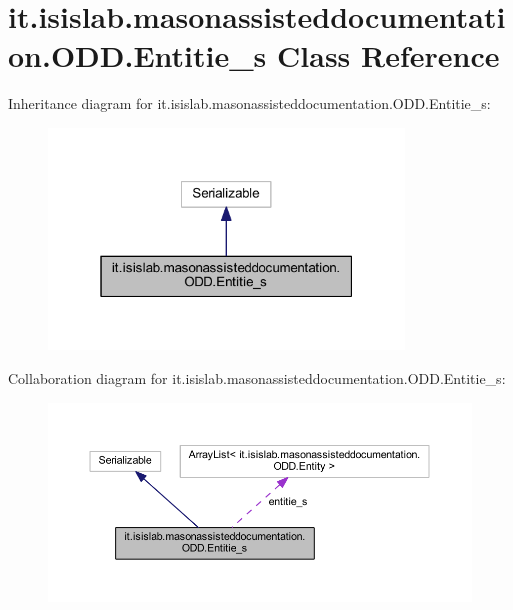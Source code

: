 \hypertarget{classit_1_1isislab_1_1masonassisteddocumentation_1_1_o_d_d_1_1_entitie__s}{\section{it.\-isislab.\-masonassisteddocumentation.\-O\-D\-D.\-Entitie\-\_\-s Class Reference}
\label{classit_1_1isislab_1_1masonassisteddocumentation_1_1_o_d_d_1_1_entitie__s}
}


Inheritance diagram for it.\-isislab.\-masonassisteddocumentation.\-O\-D\-D.\-Entitie\-\_\-s\-:
\nopagebreak
\begin{figure}[H]
\begin{center}
\leavevmode
\includegraphics[width=268pt]{classit_1_1isislab_1_1masonassisteddocumentation_1_1_o_d_d_1_1_entitie__s__inherit__graph}
\end{center}
\end{figure}


Collaboration diagram for it.\-isislab.\-masonassisteddocumentation.\-O\-D\-D.\-Entitie\-\_\-s\-:
\nopagebreak
\begin{figure}[H]
\begin{center}
\leavevmode
\includegraphics[width=350pt]{classit_1_1isislab_1_1masonassisteddocumentation_1_1_o_d_d_1_1_entitie__s__coll__graph}
\end{center}
\end{figure}
